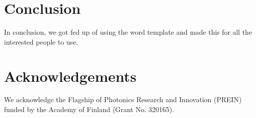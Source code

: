 \documentclass[letterpaper,10pt]{article}
\begin{document}
\section{Conclusion}
In conclusion, we got fed up of using the word template and made this for all the interested people to use.

\section*{Acknowledgements}
We acknowledge the Flagship of Photonics Research and Innovation (PREIN) funded by the Academy of Finland (Grant No. 320165).

\begin{thebibliography}{99} %

\end{thebibliography}
\end{document}
